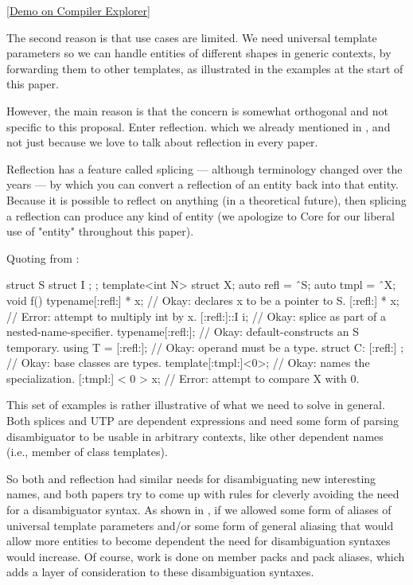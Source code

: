 \documentclass{wg21}
\begin{document}
\href{https://godbolt.org/z/oTPGvEYoa}{[Demo on Compiler Explorer]}

The second reason is that use cases are limited.
We need universal template parameters so we can handle entities of different shapes in generic contexts, by forwarding them to other templates, as illustrated in the examples at the start of this paper.

However, the main reason is that the concern is somewhat orthogonal and not specific to this proposal.
Enter reflection. which we already mentioned in , and not just because we love to talk about reflection in every paper.

Reflection has a feature called splicing --- although terminology changed over the years --- by which you can convert a reflection of an entity
back into that entity. Because it is possible to reflect on anything (in a theoretical future), then splicing a reflection
can produce any kind of entity (we apologize to Core for our liberal use of "entity" throughout this paper).

Quoting from :

\begin{quoteblock}
\begin{colorblock}
struct S { struct I { }; };
template<int N> struct X;
auto refl = ˆS;
auto tmpl = ˆX;
void f() {
    typename[:refl:] * x; // Okay: declares x to be a pointer to S.
    [:refl:] * x; // Error: attempt to multiply int by x.
    [:refl:]::I i; // Okay: splice as part of a nested-name-specifier.
    typename[:refl:]{}; // Okay: default-constructs an S temporary.
    using T = [:refl:]; // Okay: operand must be a type.
    struct C: [:refl:] {}; // Okay: base classes are types.
    template[:tmpl:]<0>; // Okay: names the specialization.
    [:tmpl:] < 0 > x; // Error: attempt to compare X with 0.
}
\end{colorblock}
\end{quoteblock}

This set of examples is rather illustrative of what we need to solve in general.
Both splices and UTP are dependent expressions and need some form of parsing disambiguator to be usable
in arbitrary contexts, like other dependent names (i.e., member of class templates).

So both  and reflection had similar needs for disambiguating new interesting names, and
both papers try to come up with rules for cleverly avoiding the need for a disambiguator syntax.
As shown in , if we allowed some form of aliases of universal template parameters and/or some form of general aliasing that would allow more entities to become dependent
the need for disambiguation syntaxes would increase.
Of course, work is done on member packs and pack aliases, which adds a layer of consideration to these disambiguation syntaxes.
\end{document}
